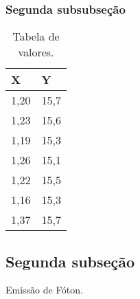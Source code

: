 \documentclass[a4paper,12pt,oneside,onecolumn]{uerj}
\begin{document}
\subsubsection{Segunda subsubseção}

\begin{table}[ht]
  \centering
  \caption{Tabela de valores.}
  \begin{tabular}{l|l}
    \hline
      X & Y\\
    \hline
      1,20 & 15,7\\
      1,23 & 15,6\\
      1,19 & 15,3\\
      1,26 & 15,1\\
      1,22 & 15,5\\
      1,16 & 15,3\\
      1,37 & 15,7\\
    \hline
  \end{tabular}
\end{table}

\subsection{Segunda subseção}

\alglinenumberson
\begin{algorithm}[!ht]
    \caption{Emissão de Fóton.} \label{alg:emissao}
    \begin{pseudocode}
      \Algoritmo{}
          \FimEnquanto
        \Senao
            \FimPara
          \Senao
      \Continua
    \end{pseudocode}
\end{algorithm}
\end{document}
